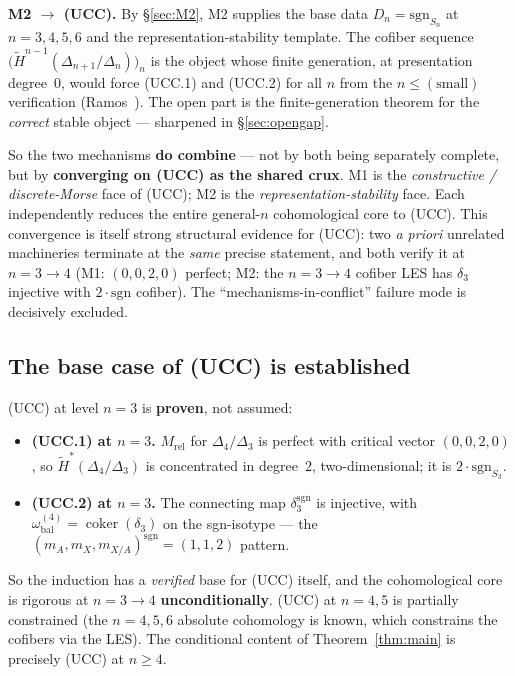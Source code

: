 \documentclass[11pt,reqno]{amsart}
\theoremstyle{plain}
\theoremstyle{definition}
\newcommand{\Hred}{\widetilde H}
\newcommand{\sgn}{\mathrm{sgn}}
\newcommand{\Mrel}{M_{\mathrm{rel}}}
\newcommand{\omegabal}[1]{\omega_{\mathrm{bal}}^{(#1)}}
\newcommand{\UCC}{\textup{(UCC)}}
\begin{document}
\smallskip
\noindent\textbf{M2 $\longrightarrow$ \UCC.}
By \S\ref{sec:M2}, M2 supplies the base data $D_n=\sgn_{S_n}$ at
$n=3,4,5,6$ and the representation-stability template. The cofiber
sequence $\bigl(\Hred^{n-1}(\Delta_{n+1}/\Delta_n)\bigr)_n$ is the
object whose finite generation, at presentation degree~$0$, would force
(UCC.1) and (UCC.2) for all $n$ from the $n\le(\text{small})$
verification (Ramos~\cite{Ramos2017}). The open part is the
finite-generation theorem for the \emph{correct} stable object ---
sharpened in \S\ref{sec:opengap}.

\smallskip
So the two mechanisms \textbf{do combine} --- not by both being
separately complete, but by \textbf{converging on \UCC{} as the shared
crux}. M1 is the \emph{constructive / discrete-Morse} face of \UCC; M2
is the \emph{representation-stability} face. Each independently reduces
the entire general-$n$ cohomological core to \UCC. This convergence is
itself strong structural evidence for \UCC: two \emph{a priori}
unrelated machineries terminate at the \emph{same} precise statement,
and both verify it at $n=3\to4$ (M1: $(0,0,2,0)$ perfect; M2: the
$n=3\to4$ cofiber LES has $\delta_3$ injective with $2\cdot\sgn$
cofiber). The ``mechanisms-in-conflict'' failure mode is decisively
excluded.

\subsection{The base case of (UCC) is established}\label{ssec:6.5}
\UCC{} at level $n=3$ is \textbf{proven}, not assumed:
\begin{itemize}[leftmargin=1.6em]
  \item \textbf{(UCC.1) at $n=3$.} $\Mrel$ for $\Delta_4/\Delta_3$ is
        perfect with critical vector $(0,0,2,0)$, so
        $\Hred^*(\Delta_4/\Delta_3)$ is concentrated in degree~$2$,
        two-dimensional; it is $2\cdot\sgn_{S_3}$.
  \item \textbf{(UCC.2) at $n=3$.} The connecting map
        $\delta_3^{\sgn}$ is injective, with
        $\omegabal4=\operatorname{coker}(\delta_3)$ on the sgn-isotype
        --- the $(m_A,m_X,m_{X/A})^{\sgn}=(1,1,2)$ pattern.
\end{itemize}
So the induction has a \emph{verified} base for \UCC{} itself, and the
cohomological core is rigorous at $n=3\to4$ \textbf{unconditionally}.
\UCC{} at $n=4,5$ is partially constrained (the $n=4,5,6$ absolute
cohomology is known, which constrains the cofibers via the LES). The
conditional content of Theorem~\ref{thm:main} is precisely \UCC{} at
$n\ge4$.
\end{document}

